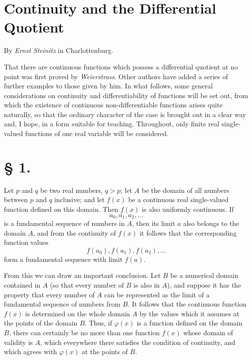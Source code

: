 
\section*{Continuity and the Differential Quotient}
\begin{center}
By \emph{Ernst Steinitz} in Charlottenburg.
\end{center}

That there are continuous functions which possess a differential quotient at no point was first proved by \emph{Weierstrass}. Other authors have added a series of further examples to those given by him. In what follows, some general considerations on continuity and differentiability of functions will be set out, from which the existence of continuous non-differentiable functions arises quite naturally, so that the ordinary character of the case is brought out in a clear way and, I hope, in a form suitable for teaching. Throughout, only finite real single-valued functions of one real variable will be considered.

\section*{§ 1.}

Let $p$ and $q$ be two real numbers, $q>p$; let $A$ be the domain of all numbers between $p$ and $q$ inclusive; and let $f(x)$ be a continuous real single-valued function defined on this domain. Then $f(x)$ is also uniformly continuous. If
\[
 a_0,a_1,a_2,\ldots
\]
is a fundamental sequence of numbers in $A$, then its limit $a$ also belongs to the domain $A$, and from the continuity of $f(x)$ it follows that the corresponding function values
\[
 f(a_0),f(a_1),f(a_2),\ldots
\]
form a fundamental sequence with limit $f(a)$.

From this we can draw an important conclusion. Let $B$ be a numerical domain contained in $A$ (so that every number of $B$ is also in $A$), and suppose it has the property that every number of $A$ can be represented as the limit of a fundamental sequence of numbers from $B$. It follows that the continuous function $f(x)$ is determined on the whole domain $A$ by the values which it assumes at the points of the domain $B$. Thus, if $\varphi(x)$ is a function defined on the domain $B$, there can certainly be no more than one function $f(x)$ whose domain of validity is $A$, which everywhere there satisfies the condition of continuity, and which agrees with $\varphi(x)$ at the points of $B$.

